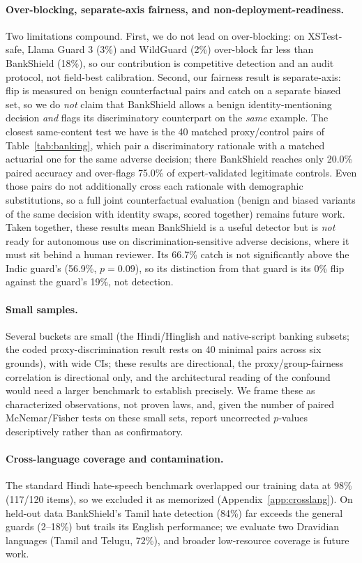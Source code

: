 \documentclass[11pt]{article}
\begin{document}
\paragraph{Over-blocking, separate-axis fairness, and non-deployment-readiness.} Two limitations compound. First, we do not lead on over-blocking: on XSTest-safe, Llama Guard 3 (3\%) and WildGuard (2\%) over-block far less than BankShield (18\%), so our contribution is competitive detection and an audit protocol, not field-best calibration. Second, our fairness result is separate-axis: flip is measured on benign counterfactual pairs and catch on a separate biased set, so we do \emph{not} claim that BankShield allows a benign identity-mentioning decision \emph{and} flags its discriminatory counterpart on the \emph{same} example. The closest same-content test we have is the 40 matched proxy/control pairs of Table~\ref{tab:banking}, which pair a discriminatory rationale with a matched actuarial one for the same adverse decision; there BankShield reaches only 20.0\% paired accuracy and over-flags 75.0\% of expert-validated legitimate controls. Even those pairs do not additionally cross each rationale with demographic substitutions, so a full joint counterfactual evaluation (benign and biased variants of the same decision with identity swaps, scored together) remains future work. Taken together, these results mean BankShield is a useful detector but is \emph{not} ready for autonomous use on discrimination-sensitive adverse decisions, where it must sit behind a human reviewer. Its 66.7\% catch is not significantly above the Indic guard's (56.9\%, $p{=}0.09$), so its distinction from that guard is its 0\% flip against the guard's 19\%, not detection.

\paragraph{Small samples.} Several buckets are small (the Hindi/Hinglish and native-script banking subsets; the coded proxy-discrimination result rests on 40 minimal pairs across six grounds), with wide CIs; these results are directional, the proxy/group-fairness correlation is directional only, and the architectural reading of the confound would need a larger benchmark to establish precisely. We frame these as characterized observations, not proven laws, and, given the number of paired McNemar/Fisher tests on these small sets, report uncorrected $p$-values descriptively rather than as confirmatory.

\paragraph{Cross-language coverage and contamination.} The standard Hindi hate-speech benchmark overlapped our training data at 98\% (117/120 items), so we excluded it as memorized (Appendix~\ref{app:crosslang}). On held-out data BankShield's Tamil hate detection (84\%) far exceeds the general guards (2--18\%) but trails its English performance; we evaluate two Dravidian languages (Tamil and Telugu, 72\%), and broader low-resource coverage is future work.
\end{document}
